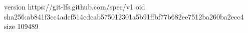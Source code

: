 version https://git-lfs.github.com/spec/v1
oid sha256:ab841f3cc4adcf514cdcab575012301a5b91ffbf77b682ee7512ba260ba2ecc4
size 109489

